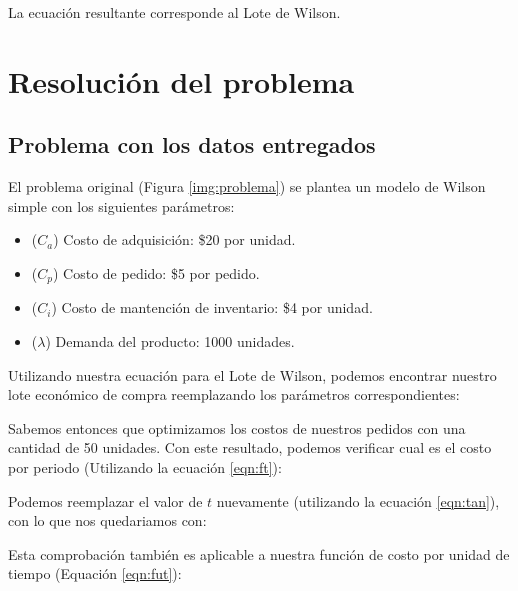 La ecuación resultante corresponde al Lote de Wilson.

\clearpage

\section{Resolución del problema}
\subsection{Problema con los datos entregados}
El problema original (Figura \ref{img:problema}) se plantea un modelo de Wilson simple con los siguientes parámetros:

\begin{itemize}
    \item ($C_a$) Costo de adquisición: \$20 por unidad.
    \item ($C_p$) Costo de pedido: \$5 por pedido.
    \item ($C_i$) Costo de mantención de inventario: \$4 por unidad.
    \item ($\lambda$) Demanda del producto: 1000 unidades.
\end{itemize}

Utilizando nuestra ecuación para el Lote de Wilson, podemos encontrar nuestro lote económico de compra reemplazando los parámetros correspondientes:


Sabemos entonces que optimizamos los costos de nuestros pedidos con una cantidad de 50 unidades. Con este resultado, podemos verificar cual es el costo por periodo (Utilizando la ecuación \ref{eqn:ft}):


Podemos reemplazar el valor de $t$ nuevamente (utilizando la ecuación \ref{eqn:tan}), con lo que nos quedariamos con:


Esta comprobación también es aplicable a nuestra función de costo por unidad de tiempo (Equación \ref{eqn:fut}):


